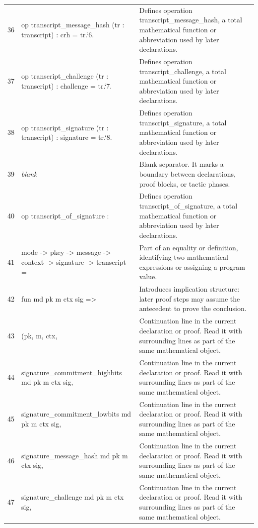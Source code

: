 \documentclass[10pt]{article}
\begin{document}
\begin{longtable}{r L{0.53\textwidth} L{0.37\textwidth}}
36 & {\ttfamily\scriptsize op transcript\_message\_hash (tr : transcript) : crh = tr.`6.} & Defines operation transcript\_message\_hash, a total mathematical function or abbreviation used by later declarations. \\
37 & {\ttfamily\scriptsize op transcript\_challenge (tr : transcript) : challenge = tr.`7.} & Defines operation transcript\_challenge, a total mathematical function or abbreviation used by later declarations. \\
38 & {\ttfamily\scriptsize op transcript\_signature (tr : transcript) : signature = tr.`8.} & Defines operation transcript\_signature, a total mathematical function or abbreviation used by later declarations. \\
39 & {\ttfamily\scriptsize \emph{blank}} & Blank separator.  It marks a boundary between declarations, proof blocks, or tactic phases. \\
40 & {\ttfamily\scriptsize op transcript\_of\_signature :} & Defines operation transcript\_of\_signature, a total mathematical function or abbreviation used by later declarations. \\
41 & {\ttfamily\scriptsize   mode -> pkey -> message -> context -> signature -> transcript =} & Part of an equality or definition, identifying two mathematical expressions or assigning a program value. \\
42 & {\ttfamily\scriptsize   fun md pk m ctx sig =>} & Introduces implication structure: later proof steps may assume the antecedent to prove the conclusion. \\
43 & {\ttfamily\scriptsize     (pk, m, ctx,} & Continuation line in the current declaration or proof.  Read it with surrounding lines as part of the same mathematical object. \\
44 & {\ttfamily\scriptsize      signature\_commitment\_highbits md pk m ctx sig,} & Continuation line in the current declaration or proof.  Read it with surrounding lines as part of the same mathematical object. \\
45 & {\ttfamily\scriptsize      signature\_commitment\_lowbits md pk m ctx sig,} & Continuation line in the current declaration or proof.  Read it with surrounding lines as part of the same mathematical object. \\
46 & {\ttfamily\scriptsize      signature\_message\_hash md pk m ctx sig,} & Continuation line in the current declaration or proof.  Read it with surrounding lines as part of the same mathematical object. \\
47 & {\ttfamily\scriptsize      signature\_challenge md pk m ctx sig,} & Continuation line in the current declaration or proof.  Read it with surrounding lines as part of the same mathematical object. \\

\end{longtable}
\end{document}
